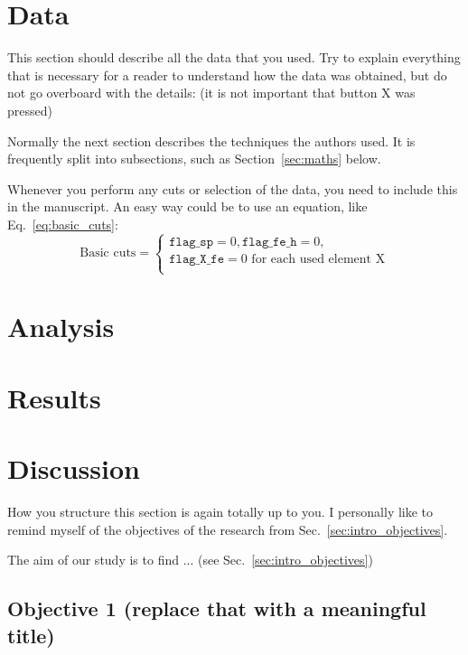 \documentclass[fleqn,usenatbib]{mnras}
\begin{document}
\section{Data} \label{sec:data}

This section should describe all the data that you used. Try to explain everything that is necessary for a reader to understand how the data was obtained, but do not go overboard with the details:  (it is not important that button X was pressed)

Normally the next section describes the techniques the authors used.
It is frequently split into subsections, such as Section~\ref{sec:maths} below.

Whenever you perform any cuts or selection of the data, you need to include this in the manuscript. An easy way could be to use an equation, like Eq.~\ref{eq:basic_cuts}:
\begin{equation} \label{eq:basic_cuts}
\text{Basic cuts} = 
\begin{cases}
\texttt{flag\_sp} = 0, \texttt{flag\_fe\_h} = 0, \\
\texttt{flag\_X\_fe} = 0 \text{ for each used element X} \\
\end{cases}
\end{equation}


\section{Analysis} \label{sec:analysis}

\section{Results} \label{sec:results}

\section{Discussion} \label{sec:discussion}

How you structure this section is again totally up to you. I personally like to remind myself of the objectives of the research from Sec.~\ref{sec:intro_objectives}.

The aim of our study is to find ... (see Sec.~\ref{sec:intro_objectives})

\subsection{Objective 1 (replace that with a meaningful title)} \label{sec:discussion_objective_1}
\end{document}
